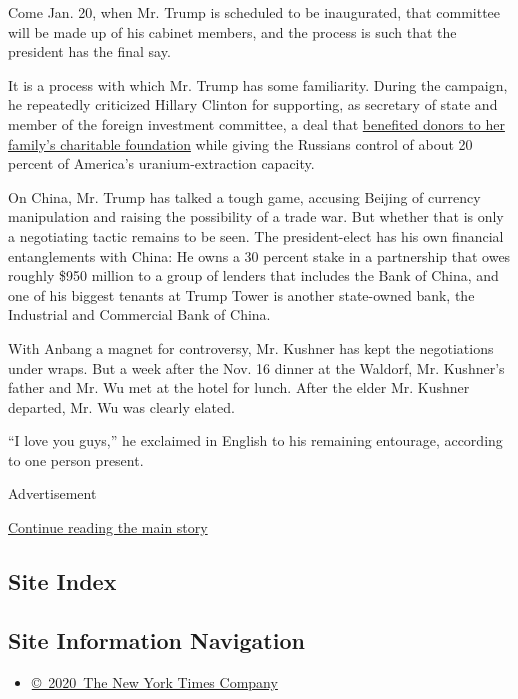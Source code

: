 Come Jan. 20, when Mr. Trump is scheduled to be inaugurated, that
committee will be made up of his cabinet members, and the process is
such that the president has the final say.

It is a process with which Mr. Trump has some familiarity. During the
campaign, he repeatedly criticized Hillary Clinton for supporting, as
secretary of state and member of the foreign investment committee, a
deal that
\href{https://www.nytimes.com/2015/04/24/us/cash-flowed-to-clinton-foundation-as-russians-pressed-for-control-of-uranium-company.html}{benefited
donors to her family's charitable foundation} while giving the Russians
control of about 20 percent of America's uranium-extraction capacity.

On China, Mr. Trump has talked a tough game, accusing Beijing of
currency manipulation and raising the possibility of a trade war. But
whether that is only a negotiating tactic remains to be seen. The
president-elect has his own financial entanglements with China: He owns
a 30 percent stake in a partnership that owes roughly \$950 million to a
group of lenders that includes the Bank of China, and one of his biggest
tenants at Trump Tower is another state-owned bank, the Industrial and
Commercial Bank of China.

With Anbang a magnet for controversy, Mr. Kushner has kept the
negotiations under wraps. But a week after the Nov. 16 dinner at the
Waldorf, Mr. Kushner's father and Mr. Wu met at the hotel for lunch.
After the elder Mr. Kushner departed, Mr. Wu was clearly elated.

``I love you guys,'' he exclaimed in English to his remaining entourage,
according to one person present.

Advertisement

\protect\hyperlink{after-bottom}{Continue reading the main story}

\hypertarget{site-index}{%
\subsection{Site Index}\label{site-index}}

\hypertarget{site-information-navigation}{%
\subsection{Site Information
Navigation}\label{site-information-navigation}}

\begin{itemize}
\tightlist
\item
  \href{https://help.nytimes.com/hc/en-us/articles/115014792127-Copyright-notice}{©~2020~The
  New York Times Company}
\end{itemize}

